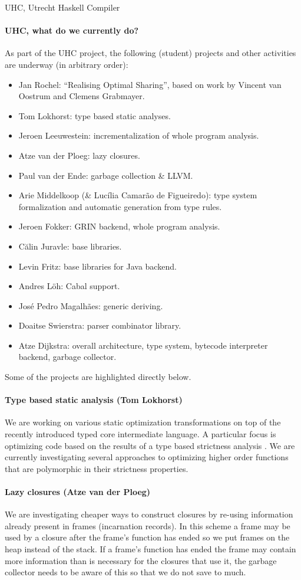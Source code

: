 \begin{hcarentry}{UHC, Utrecht Haskell Compiler}
\paragraph{UHC, what do we currently do?}
As part of the UHC project, the following (student) projects and other activities are underway (in arbitrary order):
\begin{itemize}
\item Jan Rochel: ``Realising Optimal Sharing'', based on work by Vincent van Oostrum and Clemens Grabmayer.
\item Tom Lokhorst: type based static analyses.
\item Jeroen Leeuwestein: incrementalization of whole program analysis.
\item Atze van der Ploeg: lazy closures.
\item Paul van der Ende: garbage collection \& LLVM.
\item Arie Middelkoop (\& Luc\'ilia Camar\~ao de Figueiredo): type system formalization and automatic generation from type rules.
\item Jeroen Fokker: GRIN backend, whole program analysis.
\item C\u alin Juravle: base libraries.
\item Levin Fritz: base libraries for Java backend.
\item Andres L\"oh: Cabal support.
\item Jos\'e Pedro Magalh\~aes: generic deriving.
\item Doaitse Swierstra: parser combinator library.
\item Atze Dijkstra: overall architecture, type system, bytecode interpreter backend, garbage collector.
\end{itemize}

Some of the projects are highlighted directly below.

\paragraph{Type based static analysis (Tom Lokhorst)}
We are working on various static optimization transformations on top
of the recently introduced typed core intermediate language. A
particular focus is optimizing code based on the results of a type
based strictness analysis \cite{Holdermans:2010}. We are currently
investigating several approaches to optimizing higher order functions
that are polymorphic in their strictness properties.


\paragraph{Lazy closures (Atze van der Ploeg)}
We are investigating cheaper ways to construct closures by re-using
information already present in frames (incarnation records). In this
scheme a frame may be used by a closure after the frame's function has
ended so we put frames on the heap instead of the stack. If a frame's
function has ended the frame may contain more information than is
necessary for the closures that use it, the garbage collector needs to
be aware of this so that we do not save to much.



\end{hcarentry}

